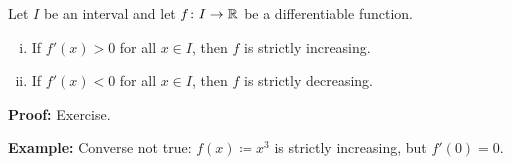 \documentclass[10pt,aspectratio=149]{beamer}
\begin{document}
\begin{frame}

\begin{proposition}
Let $I$ be an interval and
let $f \colon I \to {\mathbb{R}}$ be a differentiable function.
\begin{enumerate}[(i)]
\item
\pause
If $f'(x) > 0$ for all $x \in I$, then
$f$ is strictly increasing.
\item
\pause
If $f'(x) < 0$ for all $x \in I$,
then $f$ is strictly decreasing.
\end{enumerate}
\end{proposition}

\pause
\textbf{Proof:} Exercise.

\pause
\medskip

\textbf{Example:} Converse not true: 
$f(x) \coloneqq x^3$ is strictly increasing, but $f'(0) = 0$.

\end{frame}

%
%
%
%
%
%
\end{document}
